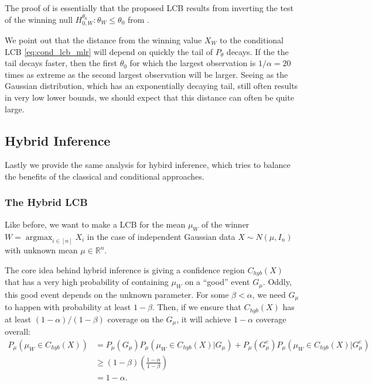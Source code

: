 \documentclass{article}
\DeclareMathOperator*{\argmax}{argmax}
\newcommand{\R}{\mathbb{R}}
\begin{document}
The proof of  is essentially that the proposed LCB results from inverting the test of the winning null $H^{\theta_0}_{0, W}: \theta_W \leq \theta_0$ from . 

We point out that the distance from the winning value $X_W$ to the conditional LCB \eqref{eq:cond_lcb_mlr} will depend on quickly the tail of $P_{\theta}$ decays. If the the tail decays faster, then the first $\theta_0$ for which the largest observation is $1/\alpha = 20$ times as extreme as the second largest observation will be larger. Seeing as the Gaussian distribution, which has an exponentially decaying tail, still often results in very low lower bounds, we should expect that this distance can often be quite large. 

\subsection{Hybrid Inference}

Lastly we provide the same analysis for hybird inference, which tries to balance the benefits of the classical and conditional approaches. 

\subsubsection{The Hybrid LCB}

Like before, we want to make a LCB for the mean $\mu_{W}$ of the winner $W = \argmax_{i \in [n]} X_i$ in the case of independent Gaussian data $X \sim N(\mu, I_n)$ with unknown mean $\mu \in \R^n$. 

The core idea behind hybrid inference is giving a confidence region $C_{hyb}(X)$ that has a very high probability of containing $\mu_W$ on a ``good'' event $G_{\mu}$. Oddly, this good event depends on the unknown parameter. For some $\beta < \alpha$, we need $G_{\mu}$ to happen with probability at least $1-\beta$. Then, if we ensure that $C_{hyb}(X)$ has at least $(1-\alpha)/(1-\beta)$ coverage on the $G_{\mu}$, it will achieve $1-\alpha$ coverage overall:
\begin{align*}
       P_{\mu}(\mu_{W} \in C_{hyb}(X)) &= P_{\mu}(G_{\mu})P_{\mu}(\mu_{W} \in C_{hyb}(X) | G_{\mu}) + P_{\mu}(G_{\mu}^c)P_{\mu}(\mu_{W} \in C_{hyb}(X) | G_{\mu}^c)\\
       &\geq (1-\beta)\left(\frac{1-\alpha}{1-\beta} \right)\\
       &=1-\alpha.
\end{align*}
\end{document}
